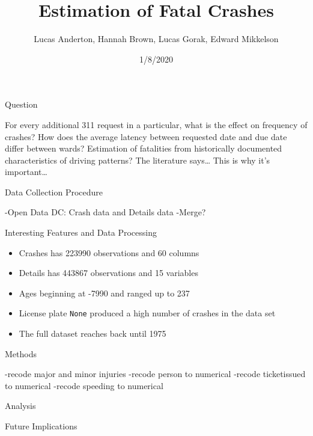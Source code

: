 \documentclass[ignorenonframetext,]{beamer}
\title{Estimation of Fatal Crashes}
\author{Lucas Anderton, Hannah Brown, Lucas Gorak, Edward Mikkelson}
\date{1/8/2020}
\providecommand{\tightlist}{%
  \setlength{\itemsep}{0pt}\setlength{\parskip}{0pt}}
\begin{document}
\frame{\titlepage}

\begin{frame}{Question}
\protect\hypertarget{question}{}

For every additional 311 request in a particular, what is the effect on
frequency of crashes? How does the average latency between requested
date and due date differ between wards? Estimation of fatalities from
historically documented characteristics of driving patterns? The
literature says\ldots{} This is why it's important\ldots{}

\end{frame}

\begin{frame}{Data Collection Procedure}
\protect\hypertarget{data-collection-procedure}{}

-Open Data DC: Crash data and Details data -Merge?

\end{frame}

\begin{frame}[fragile]{Interesting Features and Data Processing}
\protect\hypertarget{interesting-features-and-data-processing}{}

\begin{itemize}
\tightlist
\item
  Crashes has 223990 observations and 60 columns
\item
  Details has 443867 observations and 15 variables
\item
  Ages beginning at -7990 and ranged up to 237
\item
  License plate \texttt{None} produced a high number of crashes in the
  data set
\item
  The full dataset reaches back until 1975
\end{itemize}

\end{frame}

\begin{frame}{Methods}
\protect\hypertarget{methods}{}

-recode major and minor injuries -recode person to numerical -recode
ticketissued to numerical -recode speeding to numerical

\end{frame}

\begin{frame}{Analysis}
\protect\hypertarget{analysis}{}

\end{frame}

\begin{frame}{Future Implications}
\protect\hypertarget{future-implications}{}

\end{frame}
\end{document}
